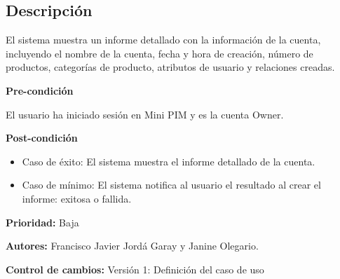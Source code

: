 
\subsection*{Descripción}
El sistema muestra un informe detallado con la información de la cuenta, incluyendo el
nombre de la cuenta, fecha y hora de creación, número de productos, categorías 
de producto, atributos de usuario y relaciones creadas.


\vspace{0.15cm}

\textbf{Pre-condición}\par
El usuario ha iniciado sesión en Mini PIM y es la cuenta Owner.\par
\vspace{0.15cm}

\textbf{Post-condición}
\begin{itemize}
    \item Caso de éxito: El sistema muestra el informe detallado de la cuenta.
    \item Caso de mínimo: El sistema notifica al usuario el resultado al crear el informe: exitosa o fallida.
\end{itemize}

\textbf{Prioridad:}
Baja
\vspace{0.15cm}

\textbf{Autores: }
Francisco Javier Jordá Garay y Janine Olegario.\par
\vspace{0.15cm}

\textbf{Control de cambios: } Versión 1: Definición del caso de uso

